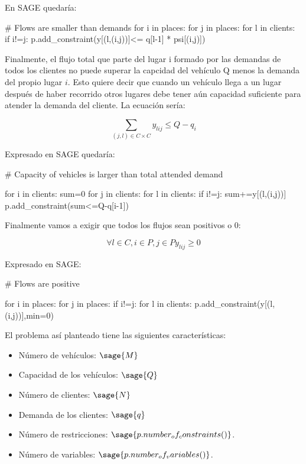 \documentclass{article}
\begin{document}
En SAGE quedaría:

\begin{sageblock}
# Flows are smaller than demands
for i in places:
   for j in places:
      for l in clients:
         if i!=j:
            p.add_constraint(y[(l,(i,j))]<= q[l-1] * psi[(i,j)])

\end{sageblock}

Finalmente, el flujo total que parte del lugar i  formado por las demandas de todos los clientes no puede superar la capcidad del vehículo Q menos la demanda del propio lugar $i$. Esto quiere decir que cuando un vehículo llega a un lugar después de haber recorrido otros lugares debe tener aún capacidad suficiente para atender la demanda del cliente.  La ecuación sería:

$$\sum_{(j,l) \in C \times C} y_{lij} \leq Q-q_i$$

Expresado en SAGE quedaría:

\begin{sageblock}

# Capacity of vehicles is larger than total attended demand

for i in clients:
   sum=0
   for j in clients:
      for l in clients:
         if i!=j:
            sum+=y[(l,(i,j))]
   p.add_constraint(sum<=Q-q[i-1])

\end{sageblock}


Finalmente vamos a exigir que todos los flujos sean positivos o 0:

$$\forall l \in C, i \in P, j \in P y_{lij} \geq 0$$

Expresado en SAGE:

\begin{sageblock}
# Flows are positive

for i in places:
   for j in places:
      if i!=j:
         for l in clients:
            p.add_constraint(y[(l,(i,j))],min=0)

\end{sageblock}

El problema así planteado tiene las siguientes características:

\begin{itemize}

\item Número de vehículos: $\sage{M}$
\item Capacidad de los vehículos: $\sage{Q}$
\item Número de clientes: $\sage{N}$
\item Demanda de los clientes: $\sage{q}$
\item Número de restricciones: $\sage{p.number_of_constraints()}$.
\item Número de variables: $\sage{p.number_of_variables()}$.

\end{itemize}
\end{document}
